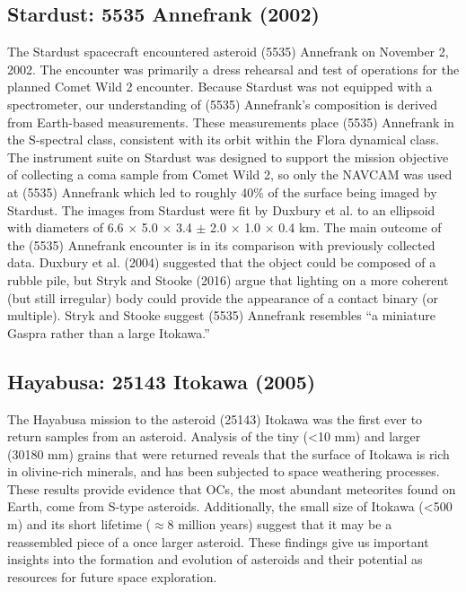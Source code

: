 \subsection{Stardust: 5535 Annefrank (2002)}

The Stardust spacecraft encountered asteroid (5535) Annefrank on November 2, 2002. The encounter was primarily a dress rehearsal and test of operations for the planned Comet Wild 2 encounter. Because Stardust was not equipped with a spectrometer, our understanding of (5535) Annefrank's composition is derived from Earth-based measurements. These measurements place (5535) Annefrank in the S-spectral class, consistent with its orbit within the Flora dynamical class. The instrument suite on Stardust was designed to support the mission objective of collecting a coma sample from Comet Wild 2, so only the \gls{NAVCAM} was used at (5535) Annefrank which led to roughly 40\% of the surface being imaged by Stardust. The images from Stardust were fit by Duxbury et al. to an ellipsoid with diameters of 6.6 $\times$ 5.0 $\times$ 3.4 $\pm$ 2.0 $\times$ 1.0 $\times$ 0.4 km. The main outcome of the (5535) Annefrank encounter is in its comparison with previously collected data. Duxbury et al. (2004) suggested that the object could be composed of a rubble pile, but Stryk and Stooke (2016) argue that lighting on a more coherent (but still irregular) body could provide the appearance of a contact binary (or multiple). Stryk and Stooke suggest (5535) Annefrank resembles ``a miniature Gaspra rather than a large Itokawa.''

\subsection{Hayabusa: 25143 Itokawa (2005)}

The Hayabusa mission to the asteroid (25143) Itokawa was the first ever to return samples from an asteroid. Analysis of the tiny (<10 mm) and larger (30{\textemdash}180 mm) grains that were returned reveals that the surface of Itokawa is rich in olivine-rich minerals, and has been subjected to space weathering processes. These results provide evidence that OCs, the most abundant meteorites found on Earth, come from S-type asteroids. Additionally, the small size of Itokawa (<500 m) and its short lifetime (${\approx}$8 million years) suggest that it may be a reassembled piece of a once larger asteroid. These findings give us important insights into the formation and evolution of asteroids and their potential as resources for future space exploration.

